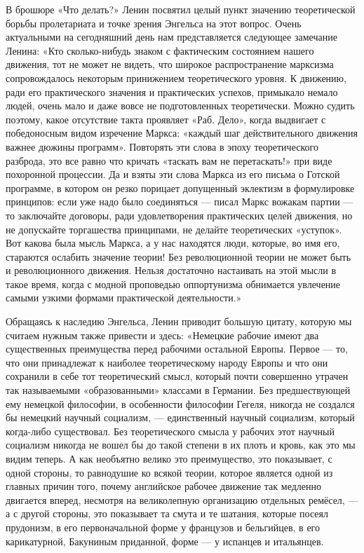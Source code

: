 \documentclass[12pt,a4paper,openany]{book}
\begin{document}
В брошюре «Что делать?» Ленин посвятил целый пункт значению теоретической борьбы пролетариата и точке зрения Энгельса на этот вопрос. Очень актуальными на сегодняшний день нам представляется следующее замечание Ленина: «Кто сколько-нибудь знаком с фактическим состоянием нашего движения, тот не может не видеть, что широкое распространение марксизма сопровождалось некоторым принижением теоретического уровня. К движению, ради его практического значения и практических успехов, примыкало немало людей, очень мало и даже вовсе не подготовленных теоретически. Можно судить поэтому, какое отсутствие такта проявляет «Раб. Дело», когда выдвигает с победоносным видом изречение Маркса: «каждый шаг действительного движения важнее дюжины программ». Повторять эти слова в эпоху теоретического разброда, это все равно что кричать «таскать вам не перетаскать!» при виде похоронной процессии. Да и взяты эти слова Маркса из его письма о Готской программе, в котором он резко порицает допущенный эклектизм в формулировке принципов: если уже надо было соединяться — писал Маркс вожакам партии — то заключайте договоры, ради удовлетворения практических целей движения, но не допускайте торгашества принципами, не делайте теоретических «уступок». Вот какова была мысль Маркса, а у нас находятся люди, которые, во имя его, стараются ослабить значение теории! Без революционной теории не может быть и революционного движения. Нельзя достаточно настаивать на этой мысли в такое время, когда с модной проповедью оппортунизма обнимается увлечение самыми узкими формами практической деятельности.»

Обращаясь к наследию Энгельса, Ленин приводит большую цитату, которую мы считаем нужным также привести и здесь: «Немецкие рабочие имеют два существенных преимущества перед рабочими остальной Европы. Первое — то, что они принадлежат к наиболее теоретическому народу Европы и что они сохранили в себе тот теоретический смысл, который почти совершенно утрачен так называемыми «образованными» классами в Германии. Без предшествующей ему немецкой философии, в особенности философии Гегеля, никогда не создался бы немецкий научный социализм, — единственный научный социализм, который когда-либо существовал. Без теоретического смысла у рабочих этот научный социализм никогда не вошел бы до такой степени в их плоть и кровь, как это мы видим теперь. А как необъятно велико это преимущество, это показывает, с одной стороны, то равнодушие ко всякой теории, которое является одной из главных причин того, почему английское рабочее движение так медленно двигается вперед, несмотря на великолепную организацию отдельных ремёсел, — а с другой стороны, это показывает та смута и те шатания, которые посеял прудонизм, в его первоначальной форме у французов и бельгийцев, в его карикатурной, Бакуниным приданной, форме — у испанцев и итальянцев.
\end{document}
